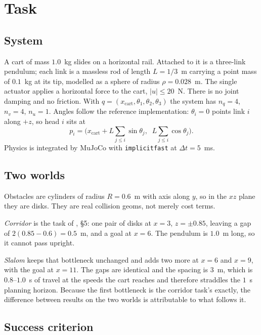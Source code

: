 \documentclass[conference]{IEEEtran}
\begin{document}
\section{Task}

\subsection{System}

A cart of mass $1.0$~kg slides on a horizontal rail. Attached to it is a
three-link pendulum; each link is a massless rod of length $L = 1/3$~m carrying
a point mass of $0.1$~kg at its tip, modelled as a sphere of radius
$\rho = 0.028$~m. The single actuator applies a horizontal force to the cart,
$|u| \leq 20$~N. There is no joint damping and no friction. With
$q = (x_{\text{cart}}, \theta_1, \theta_2, \theta_3)$ the system has $n_q = 4$,
$n_v = 4$, $n_u = 1$. Angles follow the reference implementation: $\theta_i = 0$
points link $i$ along $+z$, so head $i$ sits at
\begin{equation}
p_i = \Big(x_{\text{cart}} + L\!\!\sum_{j\le i}\!\sin\theta_j,\;\;
           L\!\!\sum_{j\le i}\!\cos\theta_j\Big).
\end{equation}
Physics is integrated by MuJoCo \cite{mujoco} with
\texttt{implicitfast} at $\Delta t = 5$~ms.

\subsection{Two worlds}

Obstacles are cylinders of radius $R = 0.6$~m with axis along $y$, so in the
$xz$ plane they are disks. They are real collision geoms, not merely cost
terms.

\emph{Corridor} is the task of \cite{caldwell2015}, \S5: one pair of disks at
$x = 3$, $z = \pm 0.85$, leaving a gap of
$2(0.85 - 0.6) = 0.5$~m, and a goal at $x = 6$. The pendulum is $1.0$~m long, so
it cannot pass upright.

\emph{Slalom} keeps that bottleneck unchanged and adds two more at $x = 6$ and
$x = 9$, with the goal at $x = 11$. The gaps are identical and the spacing is
$3$~m, which is $0.8$--$1.0$~s of travel at the speeds the cart reaches and
therefore straddles the $1$~s planning horizon. Because the first bottleneck is
the corridor task's exactly, the difference between results on the two worlds is
attributable to what follows it.

\subsection{Success criterion}
\end{document}
